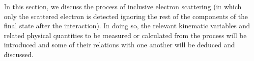 \begin{itemize}
\end{itemize}

In this section, we discuss the process of inclusive electron scattering (in which only the scattered electron is detected ignoring the rest of the components of the final state after the interaction). %
In doing so, the relevant kinematic variables and related physical quantities to be measured or calculated from the process will be introduced and %
some of their relations with one another will be deduced and discussed. 




